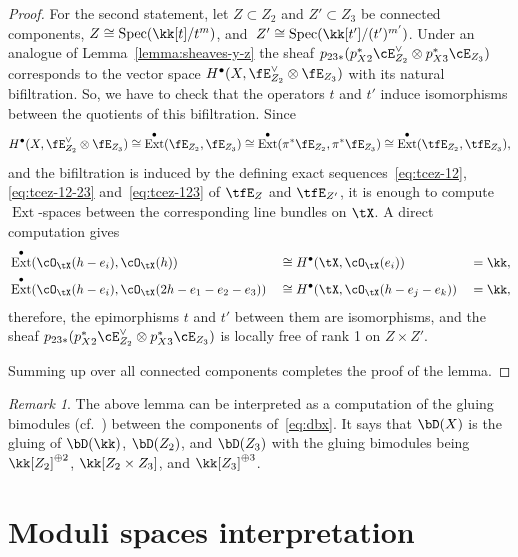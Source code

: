 \documentclass[11pt]{amsart}
\DeclareMathOperator{\Ext}{\mathrm{Ext}}
\DeclareMathOperator{\Spec}{\mathrm{Spec}}
\theoremstyle{plain}
\theoremstyle{definition}
\theoremstyle{remark}
\newtheorem{remark}[theorem]{Remark}
\begin{document}
\begin{proof}
For the second statement, let $Z \subset Z_2$ and $Z' \subset Z_3$ be connected components, 
$Z \cong \Spec(\kk[t]/t^m)$, and~$Z' \cong \Spec(\kk[t']/(t')^{m'})$.
Under an analogue of Lemma~\ref{lemma:sheaves-y-z} the sheaf $p_{23*}(p_{X2}^*\cE_{Z_2}^\vee \otimes p_{X3}^*\cE_{Z_3})$ 
corresponds to the vector space $H^\bullet(X,\fE_{Z_2}^\vee \otimes \fE_{Z_3})$ with its natural bifiltration.
So, we have to check that the operators $t$ and $t'$ induce isomorphisms between the quotients of this bifiltration.
Since
\begin{equation*}
H^\bullet(X,\fE_{Z_2}^\vee \otimes \fE_{Z_3}) 
\cong \Ext^\bullet(\fE_{Z_2},\fE_{Z_3})
\cong \Ext^\bullet(\pi^*\fE_{Z_2},\pi^*\fE_{Z_3})
\cong \Ext^\bullet(\tfE_{Z_2},\tfE_{Z_3}),
\end{equation*}
and the bifiltration is induced by the defining exact sequences~\eqref{eq:tcez-12}, \eqref{eq:tcez-12-23} and~\eqref{eq:tcez-123} of $\tfE_Z$ and $\tfE_{Z'}$, 
it is enough to compute $\Ext$-spaces between the corresponding line bundles on $\tX$.
A direct computation gives 
\begin{alignat*}{3}
& \Ext^\bullet(\cO_\tX(h-e_i),\cO_\tX(h))			&&\cong 	H^\bullet(\tX,\cO_\tX(e_i)) 		&&= \kk,\\
& \Ext^\bullet(\cO_\tX(h-e_i),\cO_\tX(2h - e_1 - e_2 - e_3)) 	&&\cong 	H^\bullet(\tX,\cO_\tX(h - e_j - e_k)) 	&&= \kk,
\end{alignat*}
therefore, the epimorphisms $t$ and $t'$ between them are isomorphisms, and the sheaf $p_{23*}(p_{X2}^*\cE_{Z_2}^\vee \otimes p_{X3}^*\cE_{Z_3})$ is locally free of rank 1 on $Z \times Z'$.

Summing up over all connected components completes the proof of the lemma.
\end{proof}

\begin{remark}
The above lemma can be interpreted as a computation of the gluing bimodules (cf.~\cite[Section~2.2]{kuznetsov2015categorical}) between the components of~\eqref{eq:dbx}.
It says that $\bD(X)$ is the gluing of $\bD(\kk)$, $\bD(Z_2)$, and $\bD(Z_3)$ with the gluing bimodules being $\kk[Z_2]^{\oplus 2}$, $\kk[Z_2 \times Z_3]$, and $\kk[Z_3]^{\oplus 3}$.
\end{remark}






\section{Moduli spaces interpretation}\label{section:moduli-spaces}
\end{document}
